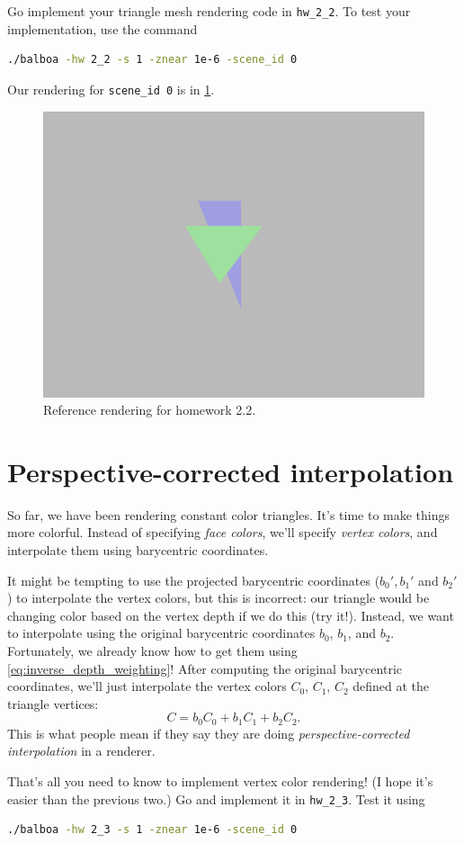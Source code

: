 Go implement your triangle mesh rendering code in \lstinline{hw_2_2}. To test your implementation, use the command
\begin{lstlisting}[language=bash]
  ./balboa -hw 2_2 -s 1 -znear 1e-6 -scene_id 0
\end{lstlisting}

Our rendering for \lstinline{scene_id 0} is in \cref{fig:hw2_2}.
\begin{figure}[h]
    \centering
    \includegraphics[width=0.5\linewidth]{imgs/hw_2_2.png}
    \caption{Reference rendering for homework 2.2.}
    \label{fig:hw2_2}
\end{figure}

\section{Perspective-corrected interpolation}

So far, we have been rendering constant color triangles. It's time to make things more colorful. Instead of specifying \emph{face colors}, we'll specify \emph{vertex colors}, and interpolate them using barycentric coordinates.

It might be tempting to use the projected barycentric coordinates ($b_0', b_1'$ and $b_2'$) to interpolate the vertex colors, but this is incorrect: our triangle would be changing color based on the vertex depth if we do this (try it!). Instead, we want to interpolate using the original barycentric coordinates $b_0$, $b_1$, and $b_2$. Fortunately, we already know how to get them using \cref{eq:inverse_depth_weighting}! After computing the original barycentric coordinates, we'll just interpolate the vertex colors $C_0$, $C_1$, $C_2$ defined at the triangle vertices:
\begin{equation}
C = b_0 C_0 + b_1 C_1 + b_2 C_2.
\end{equation}
This is what people mean if they say they are doing \emph{perspective-corrected interpolation} in a renderer.

That's all you need to know to implement vertex color rendering! (I hope it's easier than the previous two.) Go and implement it in \lstinline{hw_2_3}. Test it using
\begin{lstlisting}[language=bash]
  ./balboa -hw 2_3 -s 1 -znear 1e-6 -scene_id 0
\end{lstlisting}

